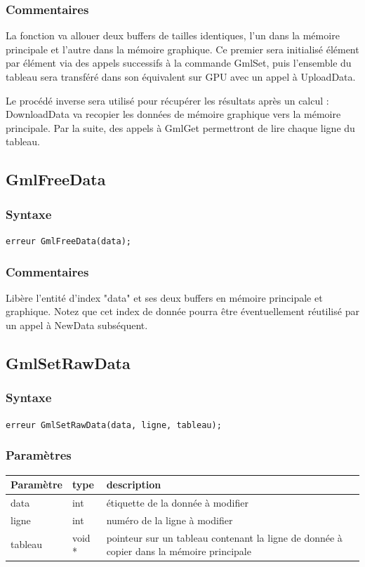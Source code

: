 \documentclass[a4paper,12pt]{article}
\begin{document}
\subsubsection*{Commentaires}

La fonction va allouer deux buffers de tailles identiques, l'un dans la mémoire principale et l'autre dans la mémoire graphique. Ce premier sera initialisé élément par élément via des appels successifs à la commande GmlSet, puis l'ensemble du tableau sera transféré dans son équivalent sur GPU avec un appel à UploadData.

Le procédé inverse sera utilisé pour récupérer les résultats après un calcul : DownloadData va recopier les données de mémoire graphique vers la mémoire principale. Par la suite, des appels à GmlGet permettront de lire chaque ligne du tableau.


\subsection{GmlFreeData}
\subsubsection*{Syntaxe}

{\tt erreur GmlFreeData(data);}
\subsubsection*{Commentaires}

Libère l'entité d'index "data" et ses deux buffers en mémoire principale et graphique. Notez que cet index de donnée pourra être éventuellement réutilisé par un appel à NewData subséquent.


\subsection{GmlSetRawData}
\subsubsection*{Syntaxe}

{\tt erreur GmlSetRawData(data, ligne, tableau);}
\subsubsection*{Paramètres}

\begin{tabular}{|m{2cm}|m{1.5cm}|m{10.5cm}|}
\hline
Paramètre  & type   & description \\
\hline
data       & int    & étiquette de la donnée à modifier \\
\hline
ligne      & int    & numéro de la ligne à modifier \\
\hline
tableau    & void * & pointeur sur un tableau contenant la ligne de donnée à copier dans la mémoire principale \\
\hline
\end{tabular}
\end{document}
